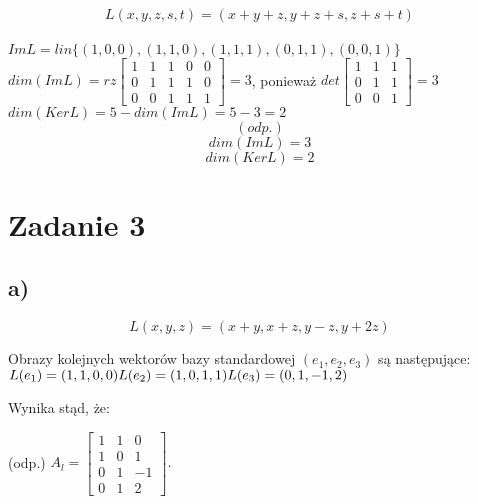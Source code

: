 \documentclass{article}
\begin{document}
$$L(x, y, z, s, t) = (x+y+z, y+z+s, z+s+t)$$ \\
$ Im L = lin \{ (1,0,0), (1,1,0), (1,1,1), (0,1,1),(0,0,1)\}$ \\ \newline \newline
$dim(Im L) = rz \left[\begin{array}{ccccc}
1 & 1 & 1 & 0 & 0 \\
0 & 1 & 1 & 1 & 0 \\
0 & 0 & 1 & 1 & 1 \end{array}\right] = 3$, ponieważ $det \left[\begin{array}{ccccc}
1 & 1 & 1 \\
0 & 1 & 1 \\
0 & 0 & 1 \end{array}\right] = 3$\newline \newline \\
$dim(Ker L) = 5 - dim(Im L) = 5 - 3 = 2$
\newline \newline
$$(odp.)$$ $$ dim(Im L) = 3$$  $$ dim(Ker L) = 2$$

\section{Zadanie 3}

\subsection{a)}
$$L(x,y,z) = (x+y, x+z, y-z, y+2z)$$ \newline

Obrazy kolejnych wektorów bazy standardowej $(e_{1}, e_{2}, e_{3})$ są następujące: \newline
$ \\
 L(e_{1}) = (1, 1, 0, 0) \\
 L(e_{2}) = (1, 0, 1, 1) \\
 L(e_{3}) = (0, 1, -1, 2) $ \newline
 
 Wynika stąd, że: \newline
 
(odp.) $ A_{l} = \left[\begin{array}{ccc}
1 & 1 & 0 \\
1 & 0 & 1 \\
0 & 1 & -1 \\
0 & 1 & 2 \end{array}\right].$ \newline
\end{document}
